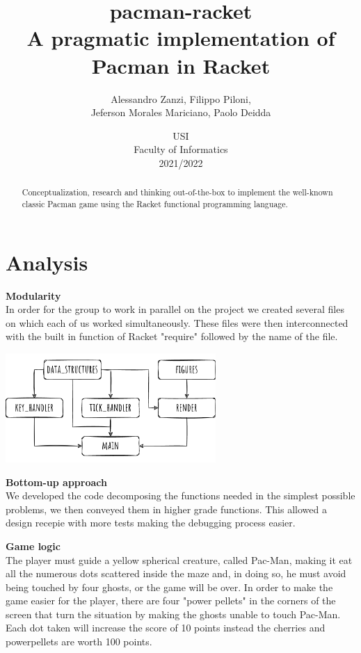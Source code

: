 \documentclass{article}
\title{
\textbf{pacman-racket} \\
A pragmatic implementation of Pacman in Racket
}
\author{
    Alessandro Zanzi,
    Filippo Piloni,\\
    Jeferson Morales Mariciano,
    Paolo Deidda
}
\date{
USI \\
Faculty of Informatics \\
[\baselineskip]  2021/2022
}
\begin{document}
\begin{titlepage}
\maketitle  

\end{titlepage}
 \begin{abstract}
Conceptualization, research and thinking out-of-the-box
to implement the well-known classic Pacman game
using the Racket functional programming language.
 \end{abstract}
\clearpage
 \tableofcontents
 \clearpage
 \section{Analysis}
 
 \hspace{0.5cm}\textbf{Modularity}\\
 In order for the group to work in parallel on the project we created several files on which each of us worked simultaneously. These files were then interconnected with the built in function of Racket "require" followed by the name of the file.
 
 \begin{center}
 \includegraphics[width=8cm]{images/dependency_tree.png}
 \end{center}
 
 \textbf{Bottom-up approach}\\
 We developed the code decomposing the functions needed in the simplest possible problems, we then conveyed them in higher grade functions. This allowed a design recepie with more tests making the debugging process easier.
 
 \textbf{Game logic}\\
The player must guide a yellow spherical creature, called Pac-Man, making it eat all the numerous dots scattered inside the maze and, in doing so, he must avoid being touched by four ghosts, or the game will be over. In order to make the game easier for the player, there are four "power pellets" in the corners of the screen that turn the situation by making the ghosts unable to touch Pac-Man. Each dot taken will increase the score of 10 points instead the cherries and powerpellets are worth 100 points.
\end{document}
